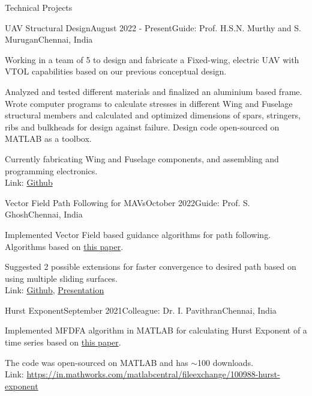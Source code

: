 \documentclass{resume} %
\begin{document}
\begin{rSection}{Technical Projects}
\begin{rSubsection}{UAV Structural Design}{August 2022 - Present}{Guide: Prof. H.S.N. Murthy and S. Murugan}{Chennai, India}
\item Working in a team of 5 to design and fabricate a Fixed-wing, electric UAV with VTOL capabilities based on our previous conceptual design.
\item Analyzed and tested different materials and finalized an aluminium based frame. Wrote computer programs to calculate stresses in different Wing and Fuselage structural members and calculated and optimized dimensions of spars, stringers, ribs and bulkheads for design against failure. Design code open-sourced on MATLAB as a toolbox.
\item Currently fabricating Wing and Fuselage components, and assembling and programming electronics. \\
Link: \href{https://github.com/atharvaaalok/UAV_StructuralDesign}{Github}
\end{rSubsection}

\begin{rSubsection}{Vector Field Path Following for MAVs}{October 2022}{Guide: Prof. S. Ghosh}{Chennai, India}
\item Implemented Vector Field based guidance algorithms for path following. Algorithms based on \href{https://ieeexplore.ieee.org/document/4252175}{this paper}.
\item Suggested 2 possible extensions for faster convergence to desired path based on using multiple sliding surfaces. \\
Link: \href{https://github.com/atharvaaalok/Vector_Field_Path_Following_for_MAVs#sliding-surfaces}{Github}, \href{https://docs.google.com/presentation/d/1O_diuoXAzuqIJYsFHQUrf4PdcYyyF2Flz2D4jMYAFyk/edit?usp=sharing}{Presentation}
\end{rSubsection}

\begin{rSubsection}{Hurst Exponent}{September 2021}{Colleague: Dr. I. Pavithran}{Chennai, India}
\item Implemented MFDFA algorithm in MATLAB for calculating Hurst Exponent of a time series based on \href{https://www.ncbi.nlm.nih.gov/pmc/articles/PMC3366552/}{this paper}.
\item The code was open-sourced on MATLAB and has $\sim$100 downloads. \\
Link: \href{https://in.mathworks.com/matlabcentral/fileexchange/100988-hurst-exponent}{https://in.mathworks.com/matlabcentral/fileexchange/100988-hurst-exponent}
\end{rSubsection}


\end{rSection}
\end{document}

